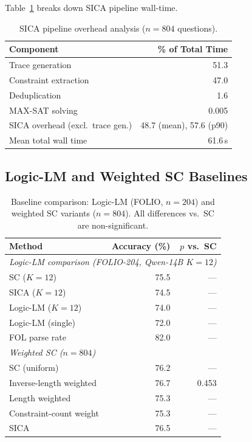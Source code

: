 \documentclass[11pt,a4paper]{article}
\begin{document}
Table~\ref{tab:overhead} breaks down SICA pipeline wall-time.

\begin{table}[h]
\centering
\caption{SICA pipeline overhead analysis ($n=804$ questions).}
\label{tab:overhead}
\small
\begin{tabular}{lr}
\toprule
\textbf{Component} & \textbf{\% of Total Time} \\
\midrule
Trace generation    & 51.3 \\
Constraint extraction & 47.0 \\
Deduplication       &  1.6 \\
MAX-SAT solving     &  0.005 \\
\midrule
SICA overhead (excl.\ trace gen.) & 48.7 (mean), 57.6 (p90) \\
Mean total wall time & 61.6\,s \\
\bottomrule
\end{tabular}
\end{table}

\subsection{Logic-LM and Weighted SC Baselines}

\begin{table}[h]
\centering
\caption{Baseline comparison: Logic-LM (FOLIO, $n=204$) and weighted SC variants ($n=804$). All differences vs.\ SC are non-significant.}
\label{tab:baselines}
\small
\begin{tabular}{lrr}
\toprule
\textbf{Method} & \textbf{Accuracy (\%)} & \textbf{$p$ vs.\ SC} \\
\midrule
\multicolumn{3}{l}{\textit{Logic-LM comparison (FOLIO-204, Qwen-14B $K=12$)}} \\
SC ($K=12$)          & 75.5 & --- \\
SICA ($K=12$)        & 74.5 & --- \\
Logic-LM ($K=12$)    & 74.0 & --- \\
Logic-LM (single)    & 72.0 & --- \\
FOL parse rate        & 82.0 & --- \\
\midrule
\multicolumn{3}{l}{\textit{Weighted SC ($n=804$)}} \\
SC (uniform)            & 76.2 & --- \\
Inverse-length weighted & 76.7 & 0.453 \\
Length weighted          & 75.3 & --- \\
Constraint-count weight & 75.3 & --- \\
SICA                    & 76.5 & --- \\
\bottomrule
\end{tabular}
\end{table}
\end{document}
